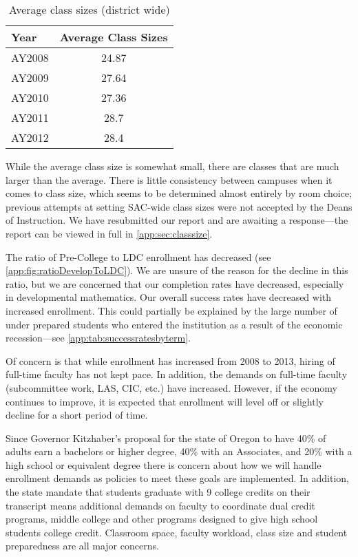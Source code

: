 \begin{table}[!htb]
	\centering
	\caption{Average class sizes (district wide)}
	\label{needs:tab:averageclasssize}
	\begin{tabular}{lS[table-format=2.2]}
		\toprule
		Year   & {Average Class Sizes } \\
		\midrule
		AY2008 & 24.87                  \\
		AY2009 & 27.64                  \\
		AY2010 & 27.36                  \\
		AY2011 & 28.7                   \\
		AY2012 & 28.4                   \\
		\bottomrule
	\end{tabular}
\end{table}

While the average class size is somewhat small, there are classes that are much
larger than the average. There is little consistency between campuses when it
comes to class size, which seems to be determined almost entirely by room
choice; previous attempts at setting SAC-wide class sizes were not accepted by
the Deans of Instruction. We have resubmitted our report and are awaiting a
response---the report \label{needs:page:classsize} can be viewed in full in \vref{app:sec:classsize}.

The ratio of Pre-College to LDC enrollment has decreased (see
\vref{app:fig:ratioDevelopToLDC}). We are unsure of the reason for the decline
in this ratio, but we are concerned that our completion rates have decreased,
especially in developmental mathematics. Our overall success rates have
decreased with increased enrollment.  This could partially be explained by the
large number of under prepared students who entered the institution as a result
of the economic recession---see \vref{app:tab:successratesbyterm}.

Of concern is that while enrollment has increased from 2008 to 2013, hiring of
full-time faculty has not kept pace. In addition, the demands on full-time
faculty (subcommittee work, LAS, CIC,  etc.) have increased.   However,
if the economy continues to improve, it is expected that enrollment will level
off or slightly decline for a short period of time.

Since Governor Kitzhaber's proposal for the state of Oregon to have 40\% of
adults earn a bachelors or higher degree, 40\% with an Associates, and 20\%
with a high school or equivalent degree there is concern about how we will handle
enrollment demands as policies to meet these goals are implemented. In addition, the state mandate that students graduate with 9 college credits on their transcript means additional demands on faculty to coordinate dual credit programs, middle college and other programs designed to give high school students college credit. Classroom space, faculty workload, class size and student preparedness are all
major concerns.


